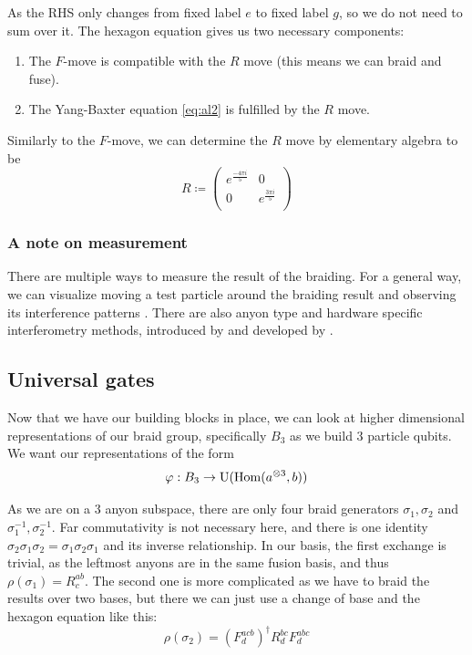 \documentclass{article}
\begin{document}
As the RHS only changes from fixed label $e$ to fixed label $g$, so we do not need to sum over it.
The hexagon equation gives us two necessary components:
\begin{enumerate}
  \item The $F$-move is compatible with the $R$ move (this means we can braid and fuse).
  \item The Yang-Baxter equation \eqref{eq:al2} is fulfilled by the $R$ move.
\end{enumerate}
Similarly to the $F$-move, we can determine the $R$ move by elementary algebra to be
\[
  R \coloneqq \begin{pmatrix}
    e^{\frac{-4\pi i}{5}} & 0  \\
    0 & e^{\frac{3\pi i}{5}}  \\
  \end{pmatrix}
\]

\subsubsection{A note on measurement}

There are multiple ways to measure the result of the braiding. For a general way, we can visualize moving a test particle around the braiding result and observing its interference patterns \cite{simon_topological_2021}. There are also anyon type and hardware specific interferometry methods, introduced by \cite{overbosch_inequivalent_2001} and developed by \cite{bonesteel_braid_2005}.

\subsection{Universal gates}

Now that we have our building blocks in place, we can look at higher dimensional representations of our braid group, specifically $B_3$ as we build $3$ particle qubits. We want our representations of the form
\[
  \varphi : B_3 \to \mathrm{U}(\operatorname{Hom}(a^{\otimes 3}, b))
\]

As we are on a $3$ anyon subspace, there are only four braid generators $\sigma_1, \sigma_2$ and $\sigma_1^{-1}, \sigma_2^{-1}$. Far commutativity is not necessary here, and there is one identity $\sigma_2 \sigma_1 \sigma_2 = \sigma_1 \sigma_2 \sigma_1$ and its inverse relationship. In our basis, the first exchange is trivial, as the leftmost anyons are in the same fusion basis, and thus $\rho(\sigma_1) = R^{ab}_{c}$. The second one is more complicated as we have to braid the results over two bases, but there we can just use a change of base and the hexagon equation like this:
\[
  \rho(\sigma_2) = \left(F^{acb}_{d}\right)^{\dagger}R^{bc}_{d}F^{abc}_{d}
\]
\end{document}
